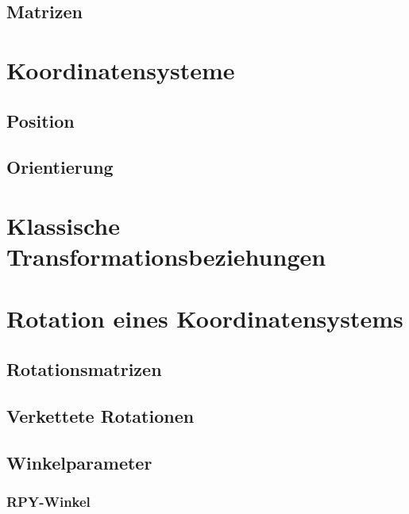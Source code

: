\documentclass[a4paper, 11pt, accentcolor = tud3b]{tudreport}
\begin{document}
			\subsection{Matrizen} %

		\section{Koordinatensysteme} %

			\subsection{Position} %

			\subsection{Orientierung} %

		\section{Klassische Transformationsbeziehungen} %

		\section{Rotation eines Koordinatensystems} %

			\subsection{Rotationsmatrizen} %

			\subsection{Verkettete Rotationen} %

			\subsection{Winkelparameter} %

				\subsubsection{RPY-Winkel} %
\end{document}
